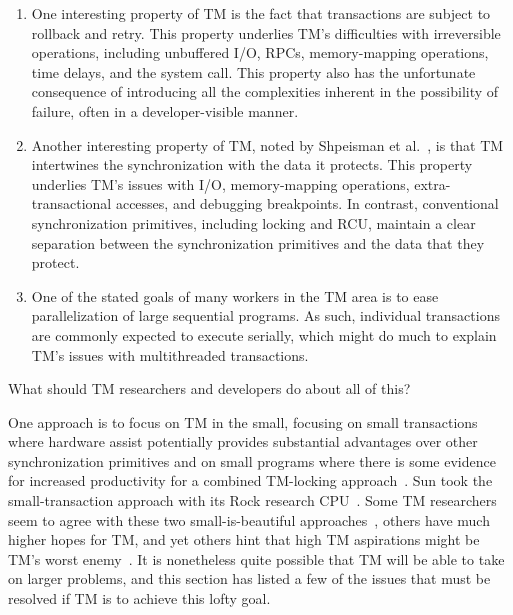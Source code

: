 \begin{enumerate}
\item	One interesting property of TM is the fact that transactions are
	subject to rollback and retry.
	This property underlies TM's difficulties with irreversible
	operations, including unbuffered I/O, RPCs, memory-mapping
	operations, time delays, and the  system call.
	This property also has the unfortunate consequence of introducing
	all the complexities inherent in the possibility of failure,
	often in a developer-visible manner.
\item	Another interesting property of TM, noted by
	Shpeisman et al.~\cite{TatianaShpeisman2009CppTM}, is that TM
	intertwines the synchronization with the data it protects.
	This property underlies TM's issues with I/O, memory-mapping
	operations, extra-transactional accesses, and debugging
	breakpoints.
	In contrast, conventional synchronization primitives, including
	locking and RCU, maintain a clear separation between the
	synchronization primitives and the data that they protect.
\item	One of the stated goals of many workers in the TM area is to
	ease parallelization of large sequential programs.
	As such, individual transactions are commonly expected to
	execute serially, which might do much to explain TM's issues
	with multithreaded transactions.
\end{enumerate}

\QuickQuizEnd

What should TM researchers and developers do about all of this?

One approach is to focus on TM in the small, focusing on small
transactions where hardware assist potentially provides substantial
advantages over other synchronization primitives and on small programs
where there is some evidence for increased productivity for a combined
TM-locking approach~\cite{VPankratius2011TMvsLockingProductivity}.
Sun took the small-transaction approach with its Rock research
CPU~\cite{DaveDice2009ASPLOSRockHTM}.
Some TM researchers seem to agree with these two small-is-beautiful
approaches~\cite{JMStone93}, others have much higher hopes for TM, and yet others
hint that high TM aspirations might be TM's worst
enemy~\cite[Section 6]{Attiya:2010:ICT:1835698.1835699}.
It is nonetheless quite possible that TM will be able to take on larger
problems, and this section has listed a few of the issues that must be
resolved if TM is to achieve this lofty goal.

